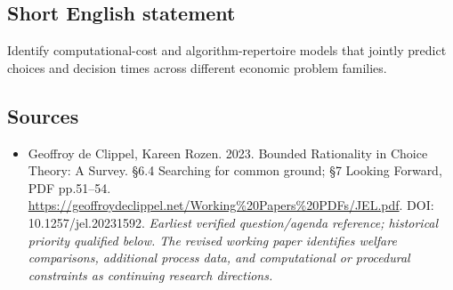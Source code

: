 \documentclass[11pt]{article}
\begin{document}
\subsection{Short English statement}
Identify computational-cost and algorithm-repertoire models that jointly predict choices and decision times across different economic problem families.

\subsection{Sources}
\begin{itemize}\raggedright
\item[\textnormal{[S1]}]\hypertarget{source:30007556:1}{} Geoffroy de Clippel, Kareen Rozen. 2023. Bounded Rationality in Choice Theory: A Survey. §6.4 Searching for common ground; §7 Looking Forward, PDF pp.51–54.
\url{https://geoffroydeclippel.net/Working%20Papers%20PDFs/JEL.pdf}.
DOI: 10.1257/jel.20231592.
{\small\textit{Earliest verified question/agenda reference; historical priority qualified below. The revised working paper identifies welfare comparisons, additional process data, and computational or procedural constraints as continuing research directions.}}
\end{itemize}
\end{document}
